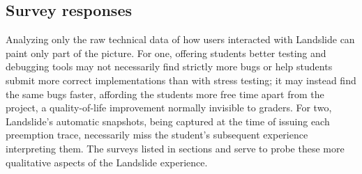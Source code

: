 \subsection{Survey responses}

Analyzing only the raw technical data of how users interacted with Landslide can paint only part of the picture.
For one, offering students better testing and debugging tools
may not necessarily find strictly more bugs or help students submit more correct implementations
than with stress testing;
it may instead find the same bugs faster,
affording the students more free time apart from the project,
a quality-of-life improvement normally invisible to graders.
For two, Landslide's automatic snapshots, being captured at the time of issuing each preemption trace,
necessarily miss the student's subsequent experience interpreting them.
The surveys listed in sections \sect{\ref{sec:education-survey-pebbles}} and \sect{\ref{sec:education-survey-pintos}}
serve to probe these more qualitative aspects of the Landslide experience.


